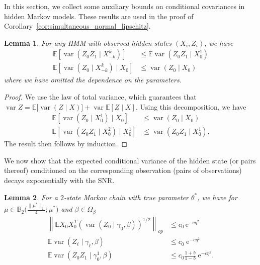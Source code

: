 \documentclass[twoside,11pt]{article}
\newtheorem{lems}{Lemma}
\renewcommand{\red}[1]{\textcolor{red}{#1}}
\newcommand{\mjwcomment}[1]{{\bf{{\red{{MJW --- #1}}}}}}
\newcommand{\Exs}{\ensuremath{{\mathbb{E}}}}
\DeclareMathOperator{\var}{var}
\def\EE{ \mathbb{E} }
\def\E{ \mathrm{e} }							%
\newcommand{\paramobs}{\mu}
\newcommand{\trueparamobs}{\ensuremath{\paramobs^*}}
\newcommand{\paramtrans}{\beta}
\newcommand{\paramspacetrans}{\ensuremath{\Omega_\paramtrans}}
\newcommand{\paramjoint}{\theta}
\newcommand{\trueparamjoint}{\paramjoint^*}
\newcommand{\paramgamma}{\gamma}
\newcommand{\elltwoballr}[2]{\ensuremath{\mathbb{B}_2\big(#1;#2\big)}}
\newcommand{\SNR}{\eta^2}
\newcommand{\kdim}{\ensuremath{k}}
\newcommand{\plaincon}{\ensuremath{c}}
\begin{document}
In this section, we collect some auxiliary bounds on conditional
covariances in hidden Markov models.  These results are used in the
proof of Corollary~\ref{cor:simultaneous_normal_lipschitz}.


%
\begin{lems}
\label{lem:varreduce}
For any HMM with observed-hidden states $(X_i, Z_i)$, we have
\begin{subequations}
\begin{align}
\label{EqnVarOwn} 
\EE \left[ \var(Z_0 Z_1\mid X_{-\kdim}^\kdim) \right] & \leq \EE
\var(Z_0 Z_1 \mid X_0^1) \\
%
\label{EqnVarOwn2}
\EE \left[ \var(Z_0 \mid X_{-\kdim}^\kdim) \mid X_0 \right] &\leq
\var(Z_0 \mid X_0)
\end{align}
\end{subequations}
where we have omitted the dependence on the parameters. 
\end{lems}

\begin{proof}
We use the law of total variance, which guarantees that $\var Z =
\EE \big[ \var (Z \mid X) \big] + \var \EE [ Z \mid X]$.
Using this decomposition, we have
\begin{align*}
\EE [\var(Z_0 \mid X_0^1) \mid X_0] &\leq \var (Z_0
\mid X_0)\\
%
\EE [\var(Z_0 Z_1 \mid X_0^2) \mid X_0^1] 
&\leq \var(Z_0Z_1 \mid X_0^1).
\end{align*} 
The result then follows by induction.
\end{proof}


We now show that the expected conditional variance of the hidden state
(or pairs thereof) conditioned on the corresponding observation (pairs
of observations) decays exponentially with the SNR.
%
\begin{lems}
\label{lem:varsnr}
For a $2$-state Markov chain with true parameter $\trueparamjoint$, we
have for $\paramobs \in
\elltwoballr{\frac{\|\trueparamobs\|_2}{4}}{\trueparamobs}$ and
$\paramtrans \in \paramspacetrans$
\begin{subequations}
\begin{align}
\label{eq:covXSNR} 
 \left\| \EE X_0 X_0^T (\var(Z_0 \mid \paramgamma_0,
 \paramtrans))^{1/2} \right\|_{op} & \leq \plaincon_0 \, \E^{-c\SNR}\\
%
\label{eq:varSNR} 
\EE \var (Z_\ell \mid \paramgamma_\ell, \paramtrans) & \leq
\plaincon_0 \; \E^{-c\SNR} \\
%
\label{eq:varTwoSNR}
\EE \var(Z_0 Z_1 \mid \paramgamma_0^1, \paramtrans) & \leq \plaincon_0
\frac{1 + b}{1-b}\; \E^{-c\SNR}.
\end{align}
\end{subequations}
\end{lems}
\end{document}
